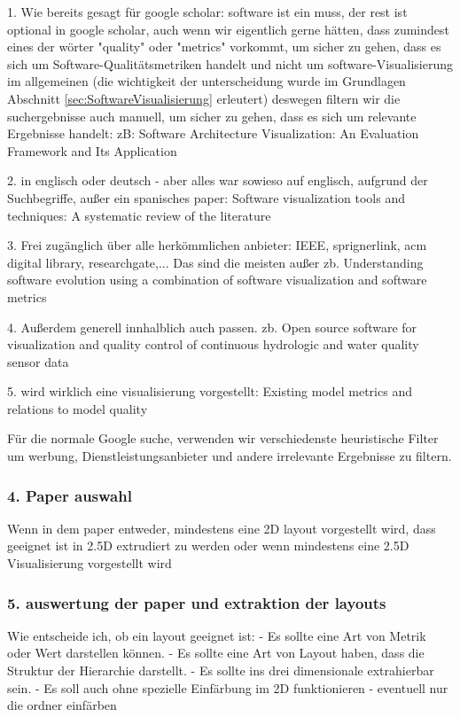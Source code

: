1. Wie bereits gesagt für google scholar: software ist ein muss, der rest ist optional in google scholar, auch wenn wir eigentlich gerne hätten, dass zumindest eines der wörter "quality" oder "metrics" vorkommt, um sicher zu gehen, dass es sich um Software-Qualitätsmetriken handelt und nicht um software-Visualisierung im allgemeinen (die wichtigkeit der unterscheidung wurde im Grundlagen Abschnitt \ref{sec:SoftwareVisualisierung} erleutert) deswegen filtern wir die suchergebnisse auch manuell, um sicher zu gehen, dass es sich um relevante Ergebnisse handelt: zB: Software Architecture Visualization: An Evaluation Framework and Its Application

2. in englisch oder deutsch - aber alles war sowieso auf englisch, aufgrund der Suchbegriffe, außer ein spanisches paper: Software visualization tools and techniques: A systematic review of the literature

3. Frei zugänglich über alle herkömmlichen anbieter: IEEE, sprignerlink, acm digital library, researchgate,... Das sind die meisten außer zb. Understanding software evolution using a combination of software visualization and software metrics

4. Außerdem generell innhalblich auch passen. zb. Open source software for visualization and quality control of continuous hydrologic and water quality sensor data 

5. wird wirklich eine visualisierung vorgestellt: Existing model metrics and relations to model quality

Für die normale Google suche, verwenden wir verschiedenste heuristische Filter um werbung, Dienstleistungsanbieter und andere irrelevante Ergebnisse zu filtern.

\subsubsection*{4. Paper auswahl} \label{sec:PaperAuswahl}
Wenn in dem paper entweder, mindestens eine 2D layout vorgestellt wird, dass geeignet ist in 2.5D extrudiert zu werden 
oder wenn mindestens eine 2.5D Visualisierung vorgestellt wird

\subsubsection*{5. auswertung der paper und extraktion der layouts} \label{sec:AuswertungPaper}
Wie entscheide ich, ob ein layout geeignet ist:
- Es sollte eine Art von Metrik oder Wert darstellen können.
- Es sollte eine Art von Layout haben, dass die Struktur der Hierarchie darstellt.
- Es sollte ins drei dimensionale extrahierbar sein.
- Es soll auch ohne spezielle Einfärbung im 2D funktionieren - eventuell nur die ordner einfärben

